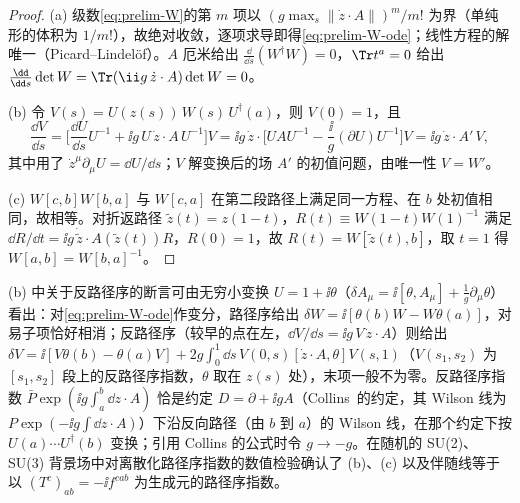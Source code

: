 \begin{proof}
(a) 级数\cref{eq:prelim-W}的第 $m$ 项以 $(g\max_s\|\dot z\cdot A\|)^m/m!$ 为界（单纯形的体积为 $1/m!$），故绝对收敛，逐项求导即得\cref{eq:prelim-W-ode}；线性方程的解唯一（Picard--Lindelöf）。$A$ 厄米给出 $\frac{\dd}{\dd s}(W^\dagger W)=0$，$\Tr t^a=0$ 给出 $\frac{\dd}{\dd s}\det W=\Tr(\ii g\,\dot z\cdot A)\det W=0$。

(b) 令 $V(s)=U(z(s))\,W(s)\,U^\dagger(a)$，则 $V(0)=1$，且
\[
\frac{\dd V}{\dd s}=\Big[\frac{\dd U}{\dd s}U^{-1}+\ii g\,U\,\dot z\cdot A\,U^{-1}\Big]V
=\ii g\,\dot z\cdot\Big[UAU^{-1}-\frac{\ii}{g}(\partial U)U^{-1}\Big]V=\ii g\,\dot z\cdot A'\,V ,
\]
其中用了 $\dot z^\mu\partial_\mu U=\dd U/\dd s$；$V$ 解变换后的场 $A'$ 的初值问题，由唯一性 $V=W'$。

(c) $W[c,b]W[b,a]$ 与 $W[c,a]$ 在第二段路径上满足同一方程、在 $b$ 处初值相同，故相等。对折返路径 $\tilde z(t)=z(1-t)$，$R(t)\equiv W(1-t)W(1)^{-1}$ 满足 $\dd R/\dd t=\ii g\,\dot{\tilde z}\cdot A(\tilde z(t))R$，$R(0)=1$，故 $R(t)=W[\tilde z(t),b]$，取 $t=1$ 得 $W[a,b]=W[b,a]^{-1}$。
\end{proof}

(b) 中关于反路径序的断言可由无穷小变换 $U=1+\ii\theta$（$\delta A_\mu=\ii[\theta,A_\mu]+\frac1g\partial_\mu\theta$）看出：对\cref{eq:prelim-W-ode}作变分，路径序给出 $\delta W=\ii[\theta(b)W-W\theta(a)]$，对易子项恰好相消；反路径序（较早的点在左，$\dd V/\dd s=\ii g\,V\,\dot z\cdot A$）则给出 $\delta V=\ii[V\theta(b)-\theta(a)V]+2g\int_0^1\dd s\,V(0,s)[\dot z\cdot A,\theta]V(s,1)$（$V(s_1,s_2)$ 为 $[s_1,s_2]$ 段上的反路径序指数，$\theta$ 取在 $z(s)$ 处），末项一般不为零。反路径序指数 $\bar P\exp(\ii g\int_a^b\dd z\cdot A)$ 恰是约定 $D=\partial+\ii gA$（Collins~\cite{Collins2011}的约定，其 Wilson 线为 $P\exp(-\ii g\int\dd z\cdot A)$）下沿反向路径（由 $b$ 到 $a$）的 Wilson 线，在那个约定下按 $U(a)\cdots U^\dagger(b)$ 变换；引用 Collins 的公式时令 $g\to-g$。在随机的 SU(2)、SU(3) 背景场中对离散化路径序指数的数值检验确认了 (b)、(c) 以及伴随线等于以 $(T^c)_{ab}=-\ii f^{cab}$ 为生成元的路径序指数。

